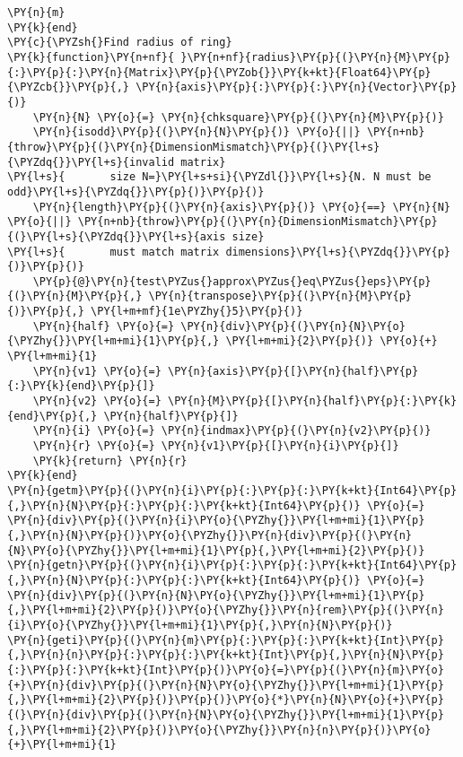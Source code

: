 \begin{Verbatim}[commandchars=\\\{\}]
    \PY{n}{m}
\PY{k}{end}
\PY{c}{\PYZsh{}Find radius of ring}
\PY{k}{function}\PY{n+nf}{ }\PY{n+nf}{radius}\PY{p}{(}\PY{n}{M}\PY{p}{:}\PY{p}{:}\PY{n}{Matrix}\PY{p}{\PYZob{}}\PY{k+kt}{Float64}\PY{p}{\PYZcb{}}\PY{p}{,} \PY{n}{axis}\PY{p}{:}\PY{p}{:}\PY{n}{Vector}\PY{p}{)}
    \PY{n}{N} \PY{o}{=} \PY{n}{chksquare}\PY{p}{(}\PY{n}{M}\PY{p}{)}
    \PY{n}{isodd}\PY{p}{(}\PY{n}{N}\PY{p}{)} \PY{o}{||} \PY{n+nb}{throw}\PY{p}{(}\PY{n}{DimensionMismatch}\PY{p}{(}\PY{l+s}{\PYZdq{}}\PY{l+s}{invalid matrix}
\PY{l+s}{       size N=}\PY{l+s+si}{\PYZdl{}}\PY{l+s}{N. N must be odd}\PY{l+s}{\PYZdq{}}\PY{p}{)}\PY{p}{)}
    \PY{n}{length}\PY{p}{(}\PY{n}{axis}\PY{p}{)} \PY{o}{==} \PY{n}{N} \PY{o}{||} \PY{n+nb}{throw}\PY{p}{(}\PY{n}{DimensionMismatch}\PY{p}{(}\PY{l+s}{\PYZdq{}}\PY{l+s}{axis size}
\PY{l+s}{       must match matrix dimensions}\PY{l+s}{\PYZdq{}}\PY{p}{)}\PY{p}{)}
    \PY{p}{@}\PY{n}{test\PYZus{}approx\PYZus{}eq\PYZus{}eps}\PY{p}{(}\PY{n}{M}\PY{p}{,} \PY{n}{transpose}\PY{p}{(}\PY{n}{M}\PY{p}{)}\PY{p}{,} \PY{l+m+mf}{1e\PYZhy{}5}\PY{p}{)}
    \PY{n}{half} \PY{o}{=} \PY{n}{div}\PY{p}{(}\PY{n}{N}\PY{o}{\PYZhy{}}\PY{l+m+mi}{1}\PY{p}{,} \PY{l+m+mi}{2}\PY{p}{)} \PY{o}{+} \PY{l+m+mi}{1}
    \PY{n}{v1} \PY{o}{=} \PY{n}{axis}\PY{p}{[}\PY{n}{half}\PY{p}{:}\PY{k}{end}\PY{p}{]}
    \PY{n}{v2} \PY{o}{=} \PY{n}{M}\PY{p}{[}\PY{n}{half}\PY{p}{:}\PY{k}{end}\PY{p}{,} \PY{n}{half}\PY{p}{]}
    \PY{n}{i} \PY{o}{=} \PY{n}{indmax}\PY{p}{(}\PY{n}{v2}\PY{p}{)}
    \PY{n}{r} \PY{o}{=} \PY{n}{v1}\PY{p}{[}\PY{n}{i}\PY{p}{]}
    \PY{k}{return} \PY{n}{r}
\PY{k}{end}
\PY{n}{getm}\PY{p}{(}\PY{n}{i}\PY{p}{:}\PY{p}{:}\PY{k+kt}{Int64}\PY{p}{,}\PY{n}{N}\PY{p}{:}\PY{p}{:}\PY{k+kt}{Int64}\PY{p}{)} \PY{o}{=} \PY{n}{div}\PY{p}{(}\PY{n}{i}\PY{o}{\PYZhy{}}\PY{l+m+mi}{1}\PY{p}{,}\PY{n}{N}\PY{p}{)}\PY{o}{\PYZhy{}}\PY{n}{div}\PY{p}{(}\PY{n}{N}\PY{o}{\PYZhy{}}\PY{l+m+mi}{1}\PY{p}{,}\PY{l+m+mi}{2}\PY{p}{)}
\PY{n}{getn}\PY{p}{(}\PY{n}{i}\PY{p}{:}\PY{p}{:}\PY{k+kt}{Int64}\PY{p}{,}\PY{n}{N}\PY{p}{:}\PY{p}{:}\PY{k+kt}{Int64}\PY{p}{)} \PY{o}{=} \PY{n}{div}\PY{p}{(}\PY{n}{N}\PY{o}{\PYZhy{}}\PY{l+m+mi}{1}\PY{p}{,}\PY{l+m+mi}{2}\PY{p}{)}\PY{o}{\PYZhy{}}\PY{n}{rem}\PY{p}{(}\PY{n}{i}\PY{o}{\PYZhy{}}\PY{l+m+mi}{1}\PY{p}{,}\PY{n}{N}\PY{p}{)}
\PY{n}{geti}\PY{p}{(}\PY{n}{m}\PY{p}{:}\PY{p}{:}\PY{k+kt}{Int}\PY{p}{,}\PY{n}{n}\PY{p}{:}\PY{p}{:}\PY{k+kt}{Int}\PY{p}{,}\PY{n}{N}\PY{p}{:}\PY{p}{:}\PY{k+kt}{Int}\PY{p}{)}\PY{o}{=}\PY{p}{(}\PY{n}{m}\PY{o}{+}\PY{n}{div}\PY{p}{(}\PY{n}{N}\PY{o}{\PYZhy{}}\PY{l+m+mi}{1}\PY{p}{,}\PY{l+m+mi}{2}\PY{p}{)}\PY{p}{)}\PY{o}{*}\PY{n}{N}\PY{o}{+}\PY{p}{(}\PY{n}{div}\PY{p}{(}\PY{n}{N}\PY{o}{\PYZhy{}}\PY{l+m+mi}{1}\PY{p}{,}\PY{l+m+mi}{2}\PY{p}{)}\PY{o}{\PYZhy{}}\PY{n}{n}\PY{p}{)}\PY{o}{+}\PY{l+m+mi}{1}

\end{Verbatim}
